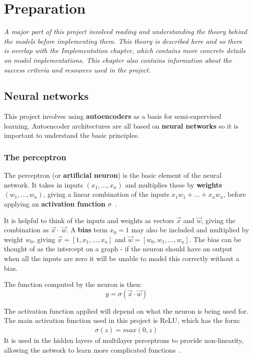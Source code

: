 \chapter{Preparation}

\textit{A major part of this project involved reading and understanding the theory behind the models before implementing them. This theory
is described here and so there is overlap with the Implementation chapter, which contains more concrete details on model implementations. 
This chapter also contains information about the success 
criteria and resources used in the project.}

\section{Neural networks}

This project involves using \textbf{autoencoders} as a basis for semi-supervised learning. 
Autoencoder architectures are all based on \textbf{neural networks} so it is important to understand the basic principles.

\subsection{The perceptron}

The perceptron (or \textbf{artificial neuron}) is the basic element of the neural network. It takes in inputs $(x_1, ..., x_n)$ and 
multiplies these by \textbf{weights} $(w_1, ..., w_n)$, giving a linear combination of the inputs $x_1w_1 + ... + x_nw_n$, before applying 
an \textbf{activation function} $\sigma$~\cite{Art_Int}.

It is helpful to think of the inputs and weights as 
vectors $\vec{x}$ and $\vec{w}$, giving the combination as $\vec{x} \cdot \ \vec{w}$. A \textbf{bias} term $x_0=1$ may also be included and multiplied by 
weight $w_0$, giving $\vec{x} = [1, x_1, ..., x_n]$ and $\vec{w} = [w_0, w_1, ..., w_n]$. The bias can be thought of as the intercept
on a graph - if the neuron should have an output when all the inputs are zero it will be unable to model this correctly without a bias.

The function computed by the neuron is then:
\begin{equation}
  y = \sigma(\vec{x} \cdot \vec{w})
\end{equation}

The activation function applied will depend on what the neuron is being used for.
The main activation function used in this project is ReLU, which has the form:
\begin{align}
  \sigma(z) = max(0, z)
  \label{eq:relu}
\end{align}
It is used in the hidden layers of multilayer perceptrons to provide non-linearity, allowing the network to learn more 
complicated functions~\cite{relu}.

